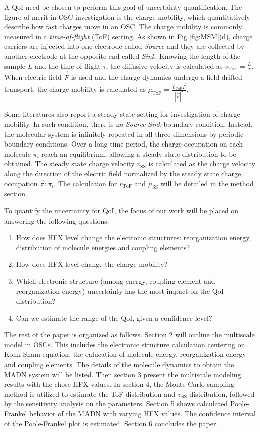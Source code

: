 \documentclass[letterpaper,12pt]{article}
\begin{document}
A QoI need be chosen to perform this goal of uncertainty quantification. 
The figure of merit in OSC investigation is the charge mobility, which quantitatively describe how fast charges move in an OSC. 
The charge mobility is commonly measured in a \textit{time-of-flight} (ToF) setting. 
As shown in Fig.\ref{fig:MSM}(d), charge carriers are injected into one electrode called \textit{Source} and they are collected by another electrode at the opposite end called \textit{Sink}. 
Knowing the length of the sample $L$ and the time-of-flight $\tau$, the diffusive velocity is calculated as $v_\text{ToF}=\frac{L}{\tau}$.
When electric field $\vec{F}$ is used and the charge dynamics undergo a field-drifted transport, the charge mobility is calculated as $\mu_\text{ToF}=\frac{\vec{v}_\text{ToF} \vec{F}}{|\vec{F}|^2}$. 

Some literatures also report a steady state setting for investigation of charge mobility. In such condition, there is no \textit{Source}-\textit{Sink} boundary condition. Instead, the molecular system is infinitely repeated in all three dimensions by periodic boundary conditions. 
Over a long time period, the charge occupation on each molecule $\pi_i$ reach an equilibrium, allowing a steady state distribution to be obtained.
The steady state charge velocity $v_\text{SS}$ is calculated as the charge velocity along the direction of the electric field normalized by the steady state charge occupation $\vec{\pi}:\pi_i$. 
The calculation for $v_\text{ToF}$ and $\mu_\text{SS}$ will be detailed in the method section.

To quantify the uncertainty for QoI, the focus of our work will be placed on answering the following questions: 
\begin{enumerate}
    \item How does HFX level change the electronic structures: reorganization energy, distribution of molecule energies and coupling elements? 
    \item How does HFX level change the charge mobility?
    \item Which electronic structure (among energy, coupling element and reorganization energy) uncertainty has the most impact on the QoI distribution?
    \item Can we estimate the range of the QoI, given a confidence level?
\end{enumerate}

The rest of the paper is organized as follows. Section 2 will outline the multiscale model in OSCs. This includes the electronic structure calculation centering on Kohn-Sham equation, the calucation of molecule energy, reorganization energy and coupling elements. The details of the molecule dynamics to obtain the MADN system will be listed.
Then section 3 present the multiscale modeling results with the chose HFX values. In section 4, the Monte Carlo sampling method is utilized to estimate the ToF distribution and $v_\text{SS}$ distribution, followed by the sensitivity analysis on the parameters. 
Section 5 shows calculated Poole-Frankel behavior of the MADN with varying HFX values. The confidence interval of the Poole-Frankel plot is estimated. Section 6 concludes the paper. 
\end{document}
